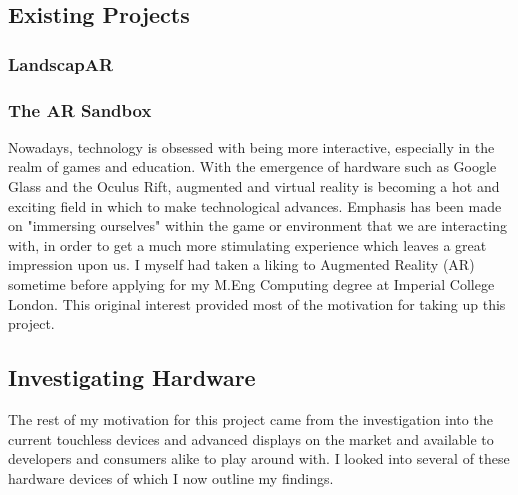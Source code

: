 \documentclass[11pt]{report}
\begin{document}
\subsection*{Existing Projects}

\subsubsection*{LandscapAR}
\subsubsection*{The AR Sandbox}




Nowadays, technology is obsessed with being more interactive, especially in 
the realm of games and education. With the emergence of hardware such as
Google Glass and the Oculus Rift, augmented and virtual reality is becoming
a hot and exciting field in which to make technological advances. Emphasis
has been made on "immersing ourselves" within the game or environment that
we are interacting with, in order to get a much more stimulating experience
which leaves a great impression upon us. I myself had taken a liking to 
Augmented Reality (AR) sometime before applying for my M.Eng Computing degree
at Imperial College London. This original interest provided most of the 
motivation for taking up this project.

\subsection*{Investigating Hardware}
The rest of my motivation for this project came from the investigation into 
the current touchless devices and advanced displays on the market and 
available to developers and consumers alike to play around with. I looked 
into several of these hardware devices of which I now outline my findings.
 
\end{document}
